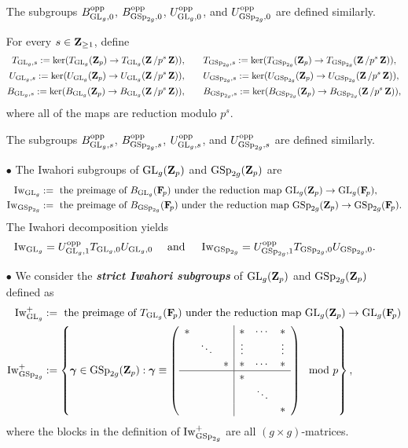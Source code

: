 \begin{enumerate}
The subgroups $B^{\opp}_{\GL_g,0}$, $B^{\opp}_{\GSp_{2g},0}$, $U^{\opp}_{\GL_g,0}$, and $U^{\opp}_{\GSp_{2g},0}$ are defined similarly.
 
For every $s\in \Z_{\geq 1}$, define \begin{align*}
        T_{\GL_g, s}:=\ker(T_{\GL_g}(\Z_p)\rightarrow T_{\GL_g}(\Z/p^s\Z)), & \qquad  T_{\GSp_{2g}, s}:=\ker(T_{\GSp_{2g}}(\Z_p)\rightarrow T_{\GSp_{2g}}(\Z/p^s\Z)),\\
        U_{\GL_g, s}:=\ker(U_{\GL_g}(\Z_p)\rightarrow U_{\GL_g}(\Z/p^s\Z)), & \qquad U_{\GSp_{2g}, s}:=\ker(U_{\GSp_{2g}}(\Z_p)\rightarrow U_{\GSp_{2g}}(\Z/p^s\Z)),\\
        B_{\GL_g, s}:=\ker(B_{\GL_g}(\Z_p)\rightarrow B_{\GL_g}(\Z/p^s\Z)), & \qquad  B_{\GSp_{2g}, s}:=\ker(B_{\GSp_{2g}}(\Z_p)\rightarrow B_{\GSp_{2g}}(\Z/p^s\Z)),
    \end{align*} where all of the maps are reduction modulo $p^s$. 
    
    The subgroups $B^{\opp}_{\GL_g,s}$, $B^{\opp}_{\GSp_{2g},s}$, $U^{\opp}_{\GL_g,s}$, and $U^{\opp}_{\GSp_{2g},s}$ are defined similarly.
    
    \item[$\bullet$] The Iwahori subgroups of $\GL_g(\Z_p)$ and $\GSp_{2g}(\Z_p)$ are \begin{align*}
        \Iw_{\GL_g} & := \text{ the preimage of $B_{\GL_g}(\F_p)$ under the reduction map $\GL_g(\Z_p)\rightarrow \GL_g(\F_p)$},\\
        \Iw_{\GSp_{2g}} & :=\text{ the preimage of $B_{\GSp_{2g}}(\F_p)$ under the reduction map $\GSp_{2g}(\Z_p)\rightarrow \GSp_{2g}(\F_p)$}.
    \end{align*} The Iwahori decomposition yields $$\Iw_{\GL_g}= U_{\GL_g, 1}^{\opp}T_{\GL_g, 0}U_{\GL_g, 0}\quad \text{ and }\quad \Iw_{\GSp_{2g}} =  U_{\GSp_{2g}, 1}^{\opp}T_{\GSp_{2g}, 0}U_{\GSp_{2g}, 0}.$$
    
    \item[$\bullet$] We consider the \textbf{\textit{strict Iwahori subgroups}} of $\GL_g(\Z_p)$ and $\GSp_{2g}(\Z_p)$ defined as \begin{align*}
        \Iw_{\GL_g}^+ & := \text{ the preimage of $T_{\GL_g}(\F_p)$ under the reduction map $\GL_g(\Z_p)\rightarrow \GL_g(\F_p)$}\\
        \Iw_{\GSp_{2g}}^{+} & := \left\{\bfgamma\in \GSp_{2g}(\Z_p): \bfgamma\equiv \left(\begin{array}{ccc|ccc}
            * &&  & * &\cdots & * \\ & \ddots & & \vdots & & \vdots \\ && * & * & \cdots & *\\ \hline &&& * &  &  \\ &&&& \ddots &  \\ &&&&& * 
        \end{array}\right)\mod p\right\},
    \end{align*} where the blocks in the definition of $\Iw_{\GSp_{2g}}^+$ are all $(g\times g)$-matrices.  
    

\end{enumerate}
